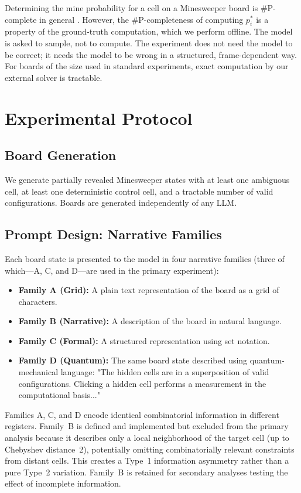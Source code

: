 \documentclass[12pt,a4paper]{article}
\begin{document}
Determining the mine probability for a cell on a Minesweeper board is \#P-complete in general \citep{kaye2000}. However, the \#P-completeness of computing $p_i^*$ is a property of the ground-truth computation, which we perform offline. The model is asked to sample, not to compute. The experiment does not need the model to be correct; it needs the model to be wrong in a structured, frame-dependent way. For boards of the size used in standard experiments, exact computation by our external solver is tractable.

\section{Experimental Protocol}
\label{sec:protocol}

\subsection{Board Generation}
\label{sec:board_gen}

We generate partially revealed Minesweeper states with at least one ambiguous cell, at least one deterministic control cell, and a tractable number of valid configurations. Boards are generated independently of any LLM.

\subsection{Prompt Design: Narrative Families}
\label{sec:prompt_design}

Each board state is presented to the model in four narrative families (three of which---A, C, and D---are used in the primary experiment):
\begin{itemize}[nosep]
    \item \textbf{Family A (Grid):} A plain text representation of the board as a grid of characters.
    \item \textbf{Family B (Narrative):} A description of the board in natural language.
    \item \textbf{Family C (Formal):} A structured representation using set notation.
    \item \textbf{Family D (Quantum):} The same board state described using quantum-mechanical language: "The hidden cells are in a superposition of valid configurations. Clicking a hidden cell performs a measurement in the computational basis..."
\end{itemize}

Families A, C, and D encode identical combinatorial information in different registers. Family~B is defined and implemented but excluded from the primary analysis because it describes only a local neighborhood of the target cell (up to Chebyshev distance~2), potentially omitting combinatorially relevant constraints from distant cells. This creates a Type~1 information asymmetry rather than a pure Type~2 variation. Family~B is retained for secondary analyses testing the effect of incomplete information.
\end{document}
